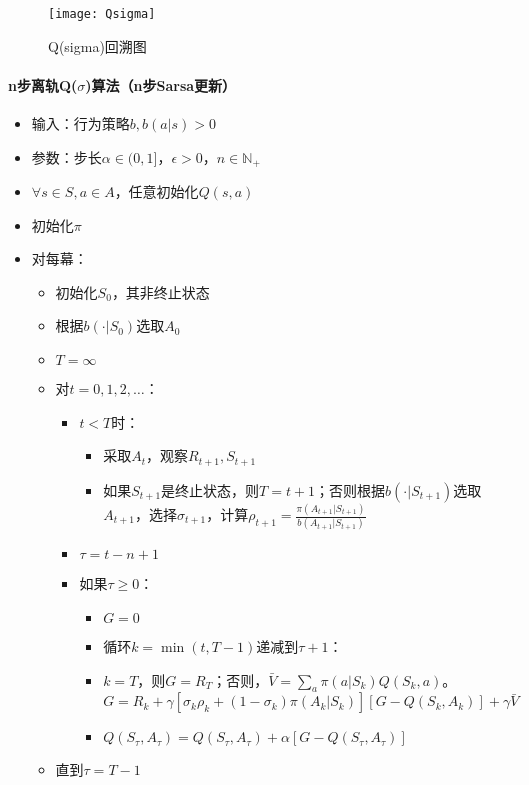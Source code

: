 \documentclass[
12pt, %
a4paper, 
oneside, %
headinclude,footinclude, %
]{scrartcl}
\begin{document}
\begin{figure}[H]
\centering
\texttt{[image: Qsigma]}
\caption[Q(sigma)回溯图]{Q(sigma)回溯图}
\end{figure}
\paragraph{n步离轨Q($ \sigma $)算法（n步Sarsa更新）}
\begin{itemize}
\item 输入：行为策略$ b, b(a|s) > 0 $
\item 参数：步长$ \alpha \in (0,1] $，$ \epsilon > 0 $，$ n \in \mathbb{N}_+ $
\item $ \forall s \in S, a \in A $，任意初始化$ Q(s, a) $
\item 初始化$ \pi $
\item 对每幕：
\begin{itemize}
\item 初始化$ S_0 $，其非终止状态
\item 根据$ b(\cdot|S_0) $选取$ A_0 $
\item $ T = \infty $
\item 对$ t = 0, 1, 2, \dots $：
\begin{itemize}
\item $ t < T $时：
\begin{itemize}
\item 采取$ A_t $，观察$ R_{t + 1}, S_{t + 1} $
\item 如果$ S_{t + 1} $是终止状态，则$ T = t + 1 $；否则根据$ b(\cdot|S_{t + 1}) $选取$ A_{t + 1} $，选择$ \sigma_{t + 1} $，计算$ \rho_{t + 1} = \frac{\pi(A_{t + 1}|S_{t + 1})}{b(A_{t + 1}|S_{t + 1})} $
\end{itemize}
\item $ \tau = t - n + 1 $
\item 如果$ \tau \geq 0 $：
\begin{itemize}
\item $ G = 0 $
\item 循环$ k = \min(t, T - 1) $递减到$ \tau + 1 $：
\item $ k = T $，则$ G = R_T $；否则，$ \bar{V} = \sum_a \pi(a|S_k)Q(S_k,a) $。$ G = R_k + \gamma[\sigma_k \rho_k + (1 - \sigma_k)\pi(A_k|S_k)][G - Q(S_k,A_k)] + \gamma\bar{V} $
\item $ Q(S_{\tau},A_{\tau}) = Q(S_{\tau},A_{\tau}) + \alpha[G - Q(S_{\tau},A_{\tau})] $
\end{itemize}
\end{itemize}
\item 直到$ \tau = T - 1 $
\end{itemize}
\end{itemize}
\end{document}

